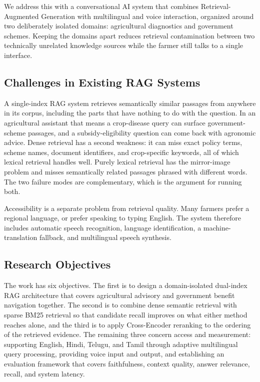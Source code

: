 \documentclass[10pt,twocolumn,letterpaper]{article}
\begin{document}
We address this with a conversational AI system that combines Retrieval-Augmented Generation with multilingual and voice interaction, organized around two deliberately isolated domains: agricultural diagnostics and government schemes. Keeping the domains apart reduces retrieval contamination between two technically unrelated knowledge sources while the farmer still talks to a single interface.

\subsection{Challenges in Existing RAG Systems}
A single-index RAG system retrieves semantically similar passages from anywhere in its corpus, including the parts that have nothing to do with the question. In an agricultural assistant that means a crop-disease query can surface government-scheme passages, and a subsidy-eligibility question can come back with agronomic advice. Dense retrieval has a second weakness: it can miss exact policy terms, scheme names, document identifiers, and crop-specific keywords, all of which lexical retrieval handles well. Purely lexical retrieval has the mirror-image problem and misses semantically related passages phrased with different words. The two failure modes are complementary, which is the argument for running both.

Accessibility is a separate problem from retrieval quality. Many farmers prefer a regional language, or prefer speaking to typing English. The system therefore includes automatic speech recognition, language identification, a machine-translation fallback, and multilingual speech synthesis.

\subsection{Research Objectives}
The work has six objectives. The first is to design a domain-isolated dual-index RAG architecture that covers agricultural advisory and government benefit navigation together. The second is to combine dense semantic retrieval with sparse BM25 retrieval so that candidate recall improves on what either method reaches alone, and the third is to apply Cross-Encoder reranking to the ordering of the retrieved evidence. The remaining three concern access and measurement: supporting English, Hindi, Telugu, and Tamil through adaptive multilingual query processing, providing voice input and output, and establishing an evaluation framework that covers faithfulness, context quality, answer relevance, recall, and system latency.
\end{document}
